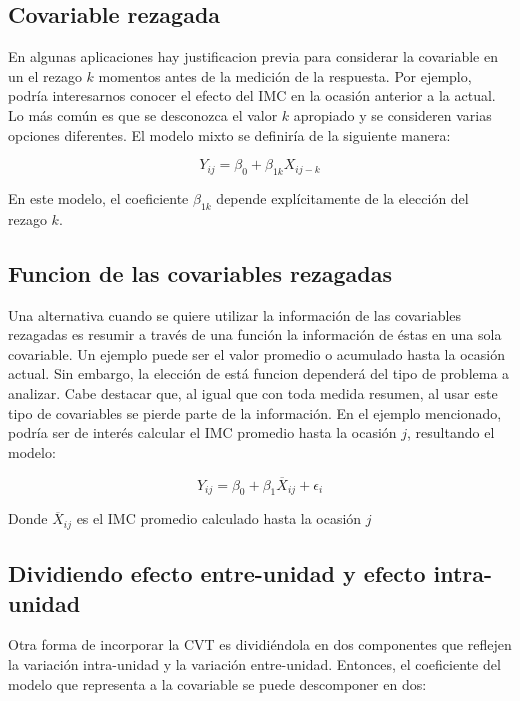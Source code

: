 \documentclass[spanish]{article}
\numberwithin{figure}{subsection}
\numberwithin{equation}{subsection}
\numberwithin{table}{subsection}
\begin{document}

\subsection{Covariable rezagada}

En algunas aplicaciones hay justificacion previa para considerar la covariable
en un el rezago $k$ momentos antes de la medición de la respuesta. Por ejemplo,
podría interesarnos conocer el efecto del IMC en la ocasión anterior a la
actual. Lo más común es que se desconozca el valor $k$ apropiado y se consideren
varias opciones diferentes. El modelo mixto se definiría de la siguiente manera:

\[ Y_{ij} = \beta_0 + \beta_{1k} X_{ij-k} \]

En este modelo, el coeficiente $\beta_{1k}$ depende explícitamente de la
elección del rezago $k$.

\subsection{Funcion de las covariables rezagadas}

Una alternativa cuando se quiere utilizar la información de las covariables
rezagadas es resumir a través de una función la información de éstas en una sola
covariable. Un ejemplo puede ser el valor promedio o acumulado hasta la ocasión
actual. Sin embargo, la elección de está funcion dependerá del tipo de problema
a analizar. Cabe destacar que, al igual que con toda medida resumen, al usar
este tipo de covariables se pierde parte de la información. En el ejemplo
mencionado, podría ser de interés calcular el IMC promedio hasta la ocasión $j$,
resultando el modelo:

\[ Y_{ij} = \beta_0 + \beta_1 \overline{X}_{ij} + \epsilon_{i} \]

Donde $\overline{X}_{ij}$ es el IMC promedio calculado hasta la ocasión $j$

\subsection{Dividiendo efecto entre-unidad y efecto intra-unidad}
\label{Dividiendo efecto entre-unidad y efecto intra-unidad}

Otra forma de incorporar la CVT es dividiéndola en dos componentes que reflejen
la variación intra-unidad y la variación entre-unidad. Entonces, el coeficiente
del modelo que representa a la covariable se puede descomponer en dos:
\end{document}
